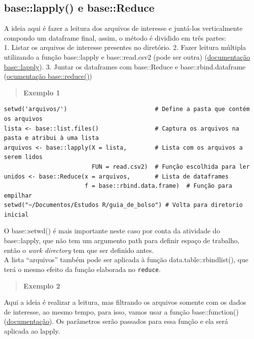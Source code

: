 \documentclass[
]{book}
\theoremstyle{definition}
\theoremstyle{definition}
\theoremstyle{definition}
\theoremstyle{definition}
\theoremstyle{remark}
\begin{document}
\hypertarget{baselapply-e-basereduce}{%
\subsection{base::lapply() e base::Reduce}\label{baselapply-e-basereduce}}

A ideia aqui é fazer a leitura dos arquivos de interesse e juntá-los verticalmente compondo um dataframe final, assim, o método é dividido em três partes:\\
1. Listar os arquivos de interesse presentes no diretório.
2. Fazer leitura múltipla utilizando a função base::lapply e base::read.csv2 (pode ser outra) (\href{https://www.rdocumentation.org/packages/base/versions/3.6.2/topics/lapply}{documentação base::lapply}).
3. Juntar os dataframes com base::Reduce e base::rbind.dataframe (\href{https://www.rdocumentation.org/packages/purrr/versions/0.2.5/topics/reduce}{ocumentação base::reduce()})

\begin{quote}
\textbf{Exemplo 1}
\end{quote}

\begin{verbatim}
setwd('arquivos/')                         # Define a pasta que contém os arquivos
lista <- base::list.files()                # Captura os arquivos na pasta e atribui à uma lista
arquivos <- base::lapply(X = lista,        # Lista com os arquivos a serem lidos
                         FUN = read.csv2)  # Função escolhida para ler
unidos <- base::Reduce(x = arquivos,       # Lista de dataframes
                       f = base::rbind.data.frame)  # Função para empilhar
setwd("~/Documentos/Estudos R/guia_de_bolso") # Volta para diretorio inicial
\end{verbatim}

O base::setwd() é mais importante neste caso por conta da atividade do base::lapply, que não tem um argumento path para definir espaço de trabalho, então o \emph{work directory} tem que ser definido antes.\\
A lista ``arquivos'' também pode ser aplicada à função data.table::rbindlist(), que terá o mesmo efeito da função elaborada no \texttt{reduce}.

\begin{quote}
\textbf{Exemplo 2}
\end{quote}

Aqui a ideia é realizar a leitura, mas filtrando os arquivos somente com os dados de interesse, ao mesmo tempo, para isso, vamos usar a função base::function() (\href{https://www.rdocumentation.org/packages/base/versions/3.6.2/topics/function}{documentação}). Os parâmetros serão passados para essa função e ela será aplicada ao lapply.
\end{document}
